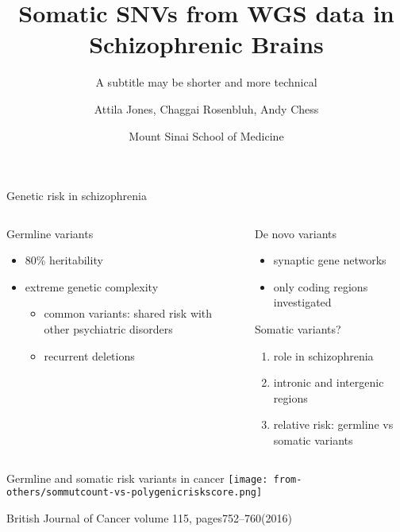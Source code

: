 \documentclass[usenames,dvipsnames]{beamer}
\title{Somatic SNVs from WGS data in Schizophrenic Brains}
\subtitle{A subtitle may be shorter and more technical}
\author{Attila Jones, Chaggai Rosenbluh, Andy Chess}
\date{Mount Sinai School of Medicine}
\begin{document}
\maketitle


\begin{frame}{Genetic risk in schizophrenia}
\begin{columns}[t]
\begin{column}{0.5\textwidth}
Germline variants
\begin{itemize}
\item 80\% heritability
\item extreme genetic complexity
\begin{itemize}
\item common variants: shared risk with other psychiatric disorders
\item recurrent deletions%
\end{itemize}
\end{itemize}
\end{column}
\begin{column}{0.5\textwidth}
De novo variants
\begin{itemize}
        \item synaptic gene networks
	\item only coding regions investigated%
\end{itemize}
\vfill
Somatic variants?
\begin{enumerate}
\item role in schizophrenia
\item intronic and intergenic regions
\item relative risk: germline vs somatic variants	
\end{enumerate}
\end{column}
\end{columns}
\end{frame}

\begin{frame}{Germline and somatic risk variants in cancer}
\texttt{[image: from-others/sommutcount-vs-polygenicriskscore.png]}

\tiny
British Journal of Cancer volume 115, pages752–760(2016)
\end{frame}
\end{document}

